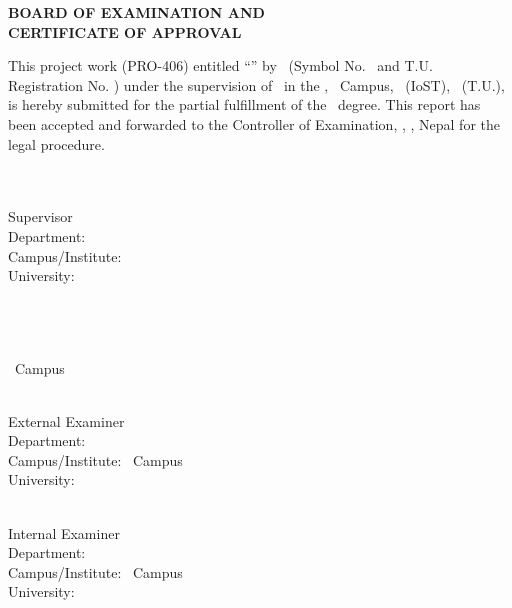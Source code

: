 \clearpage
\thispagestyle{plain}
\begin{center}
  \bfseries\fontsize{16}{18}\selectfont
  BOARD OF EXAMINATION AND\\
  CERTIFICATE OF APPROVAL
\end{center}
\vspace{1.5\baselineskip}

This project work (PRO-406) entitled ``\textbf{\ReportTitle}'' by \ReportAuthor\ (Symbol No. \SymbolNumber\ and T.U. Registration No. \RegistrationNumber) under the supervision of \SupervisorName\ in the \SupervisorDepartment, \CampusName\ Campus, \InstituteName\ (IoST), \UniversityName\ (T.U.), is hereby submitted for the partial fulfillment of the \ProgramName\ degree. This report has been accepted and forwarded to the Controller of Examination, \InstituteName, \UniversityName, Nepal for the legal procedure.

\vspace{1\baselineskip}
\noindent
\begin{minipage}[t]{0.47\textwidth}
\DashedSignatureLine{5cm}\\
\SupervisorName \\
Supervisor\\
Department: \SupervisorDepartment\\
Campus/Institute: \SupervisorCampus\\
University: \SupervisorUniversity
\end{minipage}%
\hfill
\begin{minipage}[t]{0.47\textwidth}
\DashedSignatureLine{5cm}\\
\HeadOfDepartment \\
\HeadOfDepartmentTitle\\
\CampusName\ Campus\\
\UniversityName
\end{minipage}

\vspace{1.5\baselineskip}
\noindent
\begin{minipage}[t]{0.47\textwidth}
\DashedSignatureLine{5cm}\\
External Examiner\\
Department: \DepartmentName\\
Campus/Institute: \CampusName\ Campus\\
University: \UniversityName
\end{minipage}%
\hfill
\begin{minipage}[t]{0.47\textwidth}
\DashedSignatureLine{5cm}\\
Internal Examiner\\
Department: \DepartmentName\\
Campus/Institute: \CampusName\ Campus\\
University: \UniversityName
\end{minipage}

